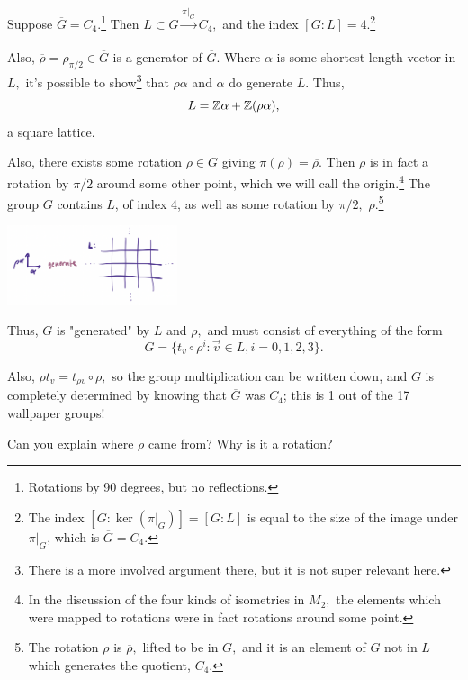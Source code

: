 \begin{example}[$C_4$]
Suppose $\overline{G} = C_4.$\footnote{Rotations by 90 degrees, but no reflections.} Then $L \subset G \xrightarrow[]{\pi|_G} C_4,$ and the index $[G: L] = 4.$\footnote{The index $[G: \ker(\pi|_G)] = [G:L]$ is equal to the size of the image under $\pi|_G$, which is $\overline{G} = C_4.$} 

Also, $\overline{\rho} = \rho_{\pi/2} \in \overline{G}$ is a generator of $\overline{G}.$ Where $\alpha$ is some shortest-length vector in $L,$ it's possible to show\footnote{There is a more involved argument there, but it is not super relevant here.} that $\rho\alpha$ and $\alpha$ do generate $L.$ Thus,
\[
L = \mathbb Z\alpha + \mathbb Z(\rho\alpha),
\]
a square lattice.

Also, there exists some rotation $\rho \in G$ giving $\pi(\rho) = \overline{\rho.}$ Then $\rho$ is in fact a rotation by $\pi/2$ around some other point, which we will call the origin.\footnote{In the discussion of the four kinds of isometries in $M_2,$ the elements which were mapped to rotations were in fact rotations around some point.} The group $G$ contains $L$, of index 4, as well as some rotation by $\pi/2,$ $\rho.$\footnote{The rotation $\rho$ is $\overline{\rho},$ lifted to be in $G,$ and it is an element of $G$ not in $L$ which generates the quotient, $C_4.$}

\begin{center}
    \includegraphics[width=5cm]{Lecture Files and Images/lec16-lattis.png}
\end{center}

Thus, $G$ is "generated" by $L$ and $\rho,$ and must consist of everything of the form 
\[
G = \{t_v \circ \rho^i: \vec{v} \in L, i = 0, 1, 2, 3\}.
\]

Also, $\rho t_v = t_{\rho v} \circ \rho,$ so the group multiplication can be written down, and $G$ is completely determined by knowing that $\overline{G}$ was $C_4$; this is 1 out of the 17 wallpaper groups!
\end{example}

\begin{question}
Can you explain where $\rho$ came from? Why is it a rotation? 
\end{question}

